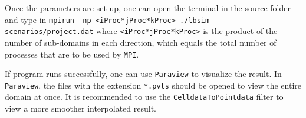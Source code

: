 \documentclass[11pt]{article}
\begin{document}
Once the parameters are set up, one can open the terminal in the source folder and type in \verb|mpirun -np <iProc*jProc*kProc> ./lbsim scenarios/project.dat| where \verb|<iProc*jProc*kProc>| is the product of the number of sub-domains in each direction, which equals the total number of processes that are to be used by \verb|MPI|.

If program runs successfully, one can use \verb|Paraview| to visualize the result. In \verb|Paraview|, the files with the extension \verb|*.pvts| should be opened to view the entire domain at once. It is recommended to use the \verb|CelldataToPointdata| filter to view a more smoother interpolated result.
\end{document}
